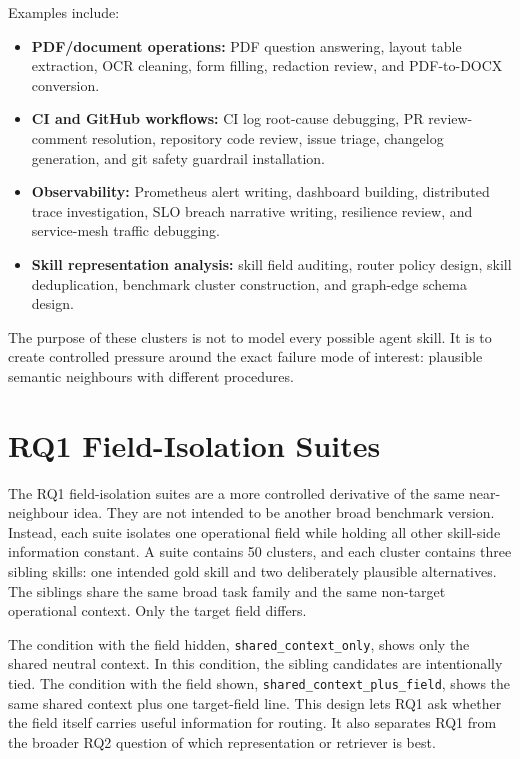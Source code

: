 Examples include:

\begin{itemize}
  \item \textbf{PDF/document operations:} PDF question answering, layout table extraction, OCR cleaning, form filling, redaction review, and PDF-to-DOCX conversion.
  \item \textbf{CI and GitHub workflows:} CI log root-cause debugging, PR review-comment resolution, repository code review, issue triage, changelog generation, and git safety guardrail installation.
  \item \textbf{Observability:} Prometheus alert writing, dashboard building, distributed trace investigation, SLO breach narrative writing, resilience review, and service-mesh traffic debugging.
  \item \textbf{Skill representation analysis:} skill field auditing, router policy design, skill deduplication, benchmark cluster construction, and graph-edge schema design.
\end{itemize}

The purpose of these clusters is not to model every possible agent skill. It is to create controlled pressure around the exact failure mode of interest: plausible semantic neighbours with different procedures.

\section{RQ1 Field-Isolation Suites}

The RQ1 field-isolation suites are a more controlled derivative of the same near-neighbour idea. They are not intended to be another broad benchmark version. Instead, each suite isolates one operational field while holding all other skill-side information constant. A suite contains 50 clusters, and each cluster contains three sibling skills: one intended gold skill and two deliberately plausible alternatives. The siblings share the same broad task family and the same non-target operational context. Only the target field differs.

The condition with the field hidden, \texttt{shared\_context\_only}, shows only the shared neutral context. In this condition, the sibling candidates are intentionally tied. The condition with the field shown, \texttt{shared\_context\_plus\_field}, shows the same shared context plus one target-field line. This design lets RQ1 ask whether the field itself carries useful information for routing. It also separates RQ1 from the broader RQ2 question of which representation or retriever is best.

